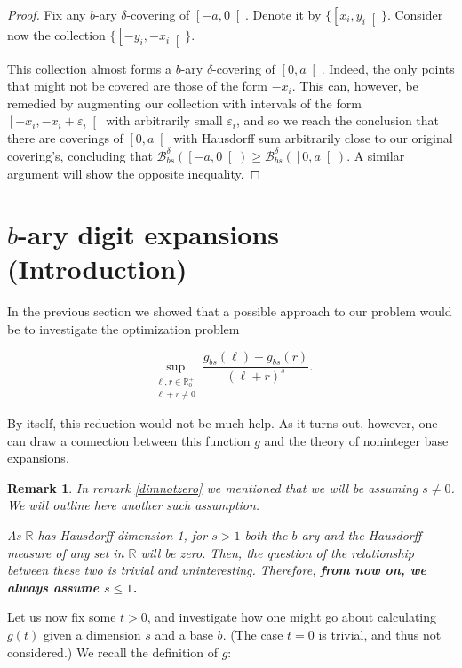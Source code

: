 \documentclass[11pt, reqno]{amsart}
\newcommand{\R}{\mathbb{R}}
\newcommand{\BB}{\mathcal{B}}
\newtheorem{remark}{Remark}
\begin{document}
\begin{proof}
Fix any $b$-ary $\delta$-covering of $\left[-a, 0\right[$. Denote it by $\{\left[x_i, y_i\right[\}$. Consider now the collection $\{\left[-y_i, -x_i\right[\}$. 

This collection almost forms a $b$-ary $\delta$-covering of $\left[0, a\right[$. Indeed, the only points that might not be covered are those of the form $-x_i$. This can, however, be remedied by augmenting our collection with intervals of the form $\left[ -x_i, -x_i + \varepsilon_i \right[$ with arbitrarily small $\varepsilon_i$, and so we reach the conclusion that there are coverings of $\left[0, a\right[$ with Hausdorff sum arbitrarily close to our original covering's, concluding that $\BB_{bs}^\delta(\left[-a, 0\right[) \geq \BB_{bs}^\delta(\left[0, a\right[)$. A similar argument will show the opposite inequality.
\end{proof}

\section{$b$-ary digit expansions (Introduction)}\label{sec6}

In the previous section we showed that a possible approach to our problem would be to investigate the optimization problem

\[ \sup_{\substack{\ell,r \in \R^+_0\\\ell+r \neq 0}} \frac{g_{bs}(\ell) + g_{bs}(r)}{(\ell + r)^s}. \]

By itself, this reduction would not be much help. As it turns out, however, one can draw a connection between this function $g$ and the theory of noninteger base expansions.

\begin{remark}
In remark \ref{dimnotzero} we mentioned that we will be assuming $s \neq 0$. We will outline here another such assumption.

As $\R$ has Hausdorff dimension 1, for $s > 1$ both the $b$-ary and the Hausdorff measure of \emph{any} set in $\R$ will be zero. Then, the question of the relationship between these two is trivial and uninteresting. Therefore, \textbf{from now on, we always assume $s \leq 1$.}
\end{remark}

Let us now fix some $t > 0$, and investigate how one might go about calculating $g(t)$ given a dimension $s$ and a base $b$. (The case $t = 0$ is trivial, and thus not considered.) We recall the definition of $g$:
\end{document}
